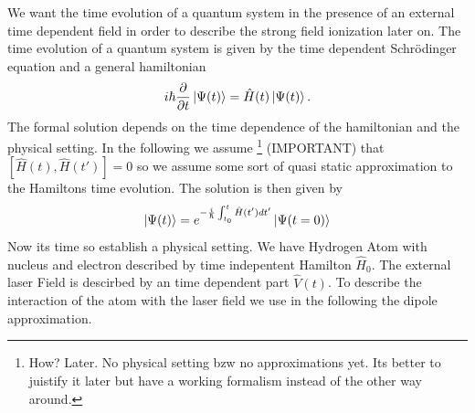 We want the time evolution of a quantum system in the presence of an external time dependent field in order to describe the strong field ionization later on.
The time evolution of a quantum system is given by the time dependent Schrödinger equation and a general hamiltonian
\begin{equation}
    i \hbar \frac{\partial}{\partial t} \ket{\Psi(t)} = \hat{H}(t) \ket{\Psi(t)}. \label{eq:schroedinger}
\end{equation}
The formal solution depends on the time dependence of the hamiltonian and the physical setting. 
In the following we assume \footnote{How? Later. No physical setting bzw no approximations yet. Its better to juistify it later but have a working formalism instead of the other way around.} (IMPORTANT) that $[\hat{H}(t), \hat{H}(t')] = 0$ so we assume some sort of quasi static approximation to the Hamiltons time evolution. 
The solution is then given by 
\begin{equation}
    \ket{\Psi(t)} = e^{-\frac{i}{\hbar} \int_{t_0}^{t} \hat{H}(t') dt'} \ket{\Psi(t=0)}
\end{equation}
Now its time so establish a physical setting. We have Hydrogen Atom with nucleus and electron described by time indepentent Hamilton $\hat{H}_0$. 
The external laser Field is descirbed by an time dependent part $\hat{V}(t)$. To describe the interaction of the atom with the laser field we use in the following the dipole approximation.




\newpage
